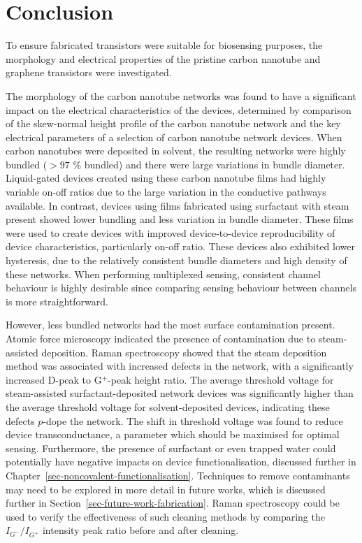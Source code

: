 \documentclass[
  a4paper,
]{scrbook}
\begin{document}
\hypertarget{conclusion}{%
\section{Conclusion}\label{conclusion}}

To ensure fabricated transistors were suitable for biosensing purposes,
the morphology and electrical properties of the pristine carbon nanotube
and graphene transistors were investigated.

The morphology of the carbon nanotube networks was found to have a
significant impact on the electrical characteristics of the devices,
determined by comparison of the skew-normal height profile of the carbon
nanotube network and the key electrical parameters of a selection of
carbon nanotube network devices. When carbon nanotubes were deposited in
solvent, the resulting networks were highly bundled (\(>97\) \% bundled)
and there were large variations in bundle diameter. Liquid-gated devices
created using these carbon nanotube films had highly variable on-off
ratios due to the large variation in the conductive pathways available.
In contrast, devices using films fabricated using surfactant with steam
present showed lower bundling and less variation in bundle diameter.
These films were used to create devices with improved device-to-device
reproducibility of device characteristics, particularly on-off ratio.
These devices also exhibited lower hysteresis, due to the relatively
consistent bundle diameters and high density of these networks. When
performing multiplexed sensing, consistent channel behaviour is highly
desirable since comparing sensing behaviour between channels is more
straightforward.

However, less bundled networks had the most surface contamination
present. Atomic force microscopy indicated the presence of contamination
due to steam-assisted deposition. Raman spectroscopy showed that the
steam deposition method was associated with increased defects in the
network, with a significantly increased D-peak to G\(^+\)-peak height
ratio. The average threshold voltage for steam-assisted
surfactant-deposited network devices was significantly higher than the
average threshold voltage for solvent-deposited devices, indicating
these defects \(p\)-dope the network. The shift in threshold voltage was
found to reduce device transconductance, a parameter which should be
maximised for optimal sensing. Furthermore, the presence of surfactant
or even trapped water could potentially have negative impacts on device
functionalisation, discussed further in
Chapter~\ref{sec-noncovalent-functionalisation}. Techniques to remove
contaminants may need to be explored in more detail in future works,
which is discussed further in Section~\ref{sec-future-work-fabrication}.
Raman spectroscopy could be used to verify the effectiveness of such
cleaning methods by comparing the \(I_{G^-}/I_{G^+}\) intensity peak
ratio before and after cleaning.
\end{document}
